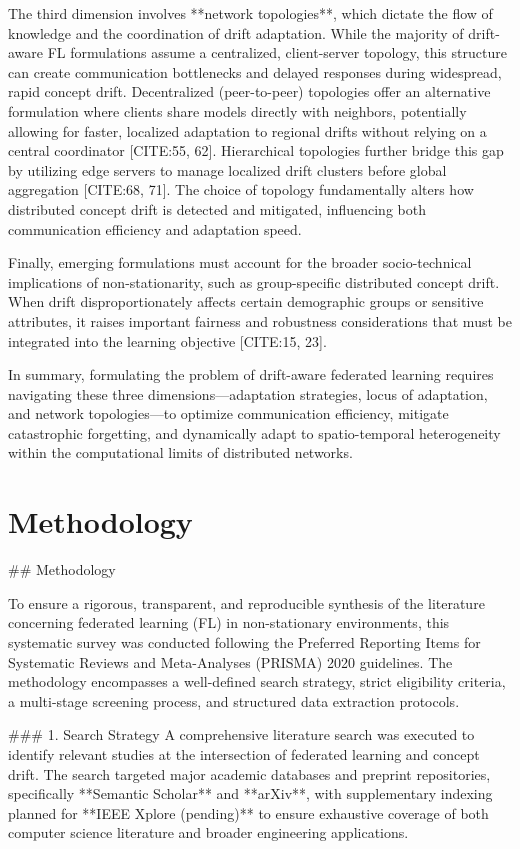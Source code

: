 \documentclass[journal]{IEEEtran}
\begin{document}
The third dimension involves **network topologies**, which dictate the flow of knowledge and the coordination of drift adaptation. While the majority of drift-aware FL formulations assume a centralized, client-server topology, this structure can create communication bottlenecks and delayed responses during widespread, rapid concept drift. Decentralized (peer-to-peer) topologies offer an alternative formulation where clients share models directly with neighbors, potentially allowing for faster, localized adaptation to regional drifts without relying on a central coordinator [CITE:55, 62]. Hierarchical topologies further bridge this gap by utilizing edge servers to manage localized drift clusters before global aggregation [CITE:68, 71]. The choice of topology fundamentally alters how distributed concept drift is detected and mitigated, influencing both communication efficiency and adaptation speed.

Finally, emerging formulations must account for the broader socio-technical implications of non-stationarity, such as group-specific distributed concept drift. When drift disproportionately affects certain demographic groups or sensitive attributes, it raises important fairness and robustness considerations that must be integrated into the learning objective [CITE:15, 23]. 

In summary, formulating the problem of drift-aware federated learning requires navigating these three dimensions—adaptation strategies, locus of adaptation, and network topologies—to optimize communication efficiency, mitigate catastrophic forgetting, and dynamically adapt to spatio-temporal heterogeneity within the computational limits of distributed networks.

\section{Methodology}
\label{sec:methodology}

## Methodology

To ensure a rigorous, transparent, and reproducible synthesis of the literature concerning federated learning (FL) in non-stationary environments, this systematic survey was conducted following the Preferred Reporting Items for Systematic Reviews and Meta-Analyses (PRISMA) 2020 guidelines. The methodology encompasses a well-defined search strategy, strict eligibility criteria, a multi-stage screening process, and structured data extraction protocols.

### 1. Search Strategy
A comprehensive literature search was executed to identify relevant studies at the intersection of federated learning and concept drift. The search targeted major academic databases and preprint repositories, specifically **Semantic Scholar** and **arXiv**, with supplementary indexing planned for **IEEE Xplore (pending)** to ensure exhaustive coverage of both computer science literature and broader engineering applications. 
\end{document}
